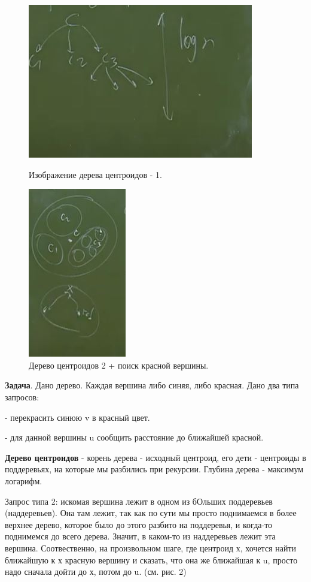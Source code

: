 \begin{figure}[!htb]
   \begin{minipage}{.5\textwidth}
     \centering
     \includegraphics[height = 4 cm]{images/100-102_decomposition}
     \caption{Изображение дерева центроидов - 1.}
   \end{minipage}\hfill
    \begin{minipage}{.5\textwidth}
     \centering
     \includegraphics[height = 4 cm]{images/100-102_decomp2}
     \caption{Дерево центроидов 2 + поиск красной вершины.}
   \end{minipage}
\end{figure}

\textbf{Задача}. Дано дерево. Каждая вершина либо синяя, либо красная. Дано два типа запросов:

- перекрасить синюю v в красный цвет.

- для данной вершины u сообщить расстояние до ближайшей красной.

\textbf{Дерево центроидов} - корень дерева - исходный центроид, его дети - центроиды в поддеревьях, на которые мы разбились при рекурсии. Глубина дерева - максимум логарифм.


Запрос типа 2: искомая вершина лежит в одном из бОльших поддеревьев (наддеревьев). Она там лежит, так как по сути мы просто поднимаемся в более верхнее дерево, которое было до этого разбито на поддеревья, и когда-то поднимемся до всего дерева. Значит, в каком-то из наддеревьев лежит эта вершина.  Соотвественно, на произвольном шаге, где центроид х, хочется найти ближайшую к х красную вершину и сказать, что она же ближайшая к u, просто надо сначала дойти до х, потом до u. (см. рис. 2)

